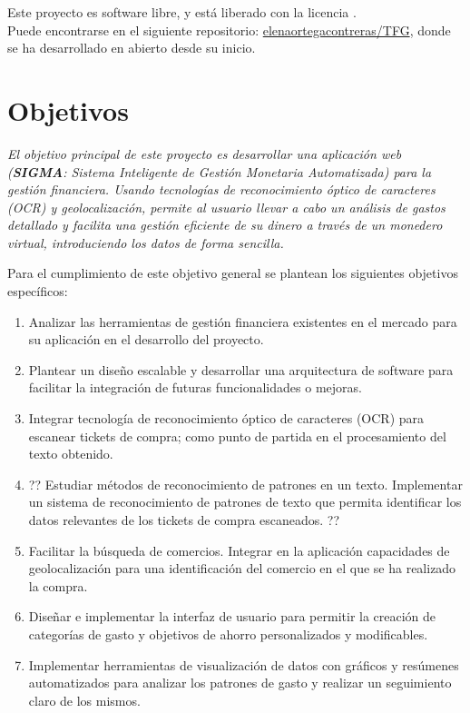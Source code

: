 Este proyecto es software libre, y está liberado con la licencia \cite{gplv3}.\\
Puede encontrarse en el siguiente repositorio:
\href{https://github.com/elenaortegacontreras/TFG}{elenaortegacontreras/TFG}, 
donde se ha desarrollado en abierto desde su inicio.

\section{Objetivos} \label{sect:goals}
\textit{El objetivo principal de este proyecto es desarrollar una aplicación web (\textbf{SIGMA}: Sistema Inteligente de Gestión Monetaria Automatizada) 
para la gestión financiera. Usando tecnologías de reconocimiento
óptico de caracteres (OCR) y geolocalización, permite al usuario llevar a cabo un 
análisis de gastos detallado y facilita una gestión eficiente de su dinero
a través de un monedero virtual, introduciendo los datos de 
forma sencilla.}

Para el cumplimiento de este objetivo general se plantean los siguientes objetivos específicos:
\begin{enumerate}
    \item Analizar las herramientas  
        de gestión financiera existentes en el mercado para su aplicación en el desarrollo del proyecto.  
    \item Plantear un diseño escalable y desarrollar una arquitectura de software
    para facilitar la integración de futuras funcionalidades o mejoras. 
    \item Integrar tecnología de reconocimiento óptico de caracteres (OCR) para escanear tickets de compra; como punto de partida en el procesamiento del texto obtenido.
    \item ?? Estudiar métodos de reconocimiento de patrones en un texto. Implementar 
        un sistema de reconocimiento de patrones de texto que permita identificar 
        los datos relevantes de los tickets de compra escaneados. ??
    \item Facilitar la búsqueda de comercios. Integrar en la aplicación capacidades de geolocalización para una identificación del comercio en el que se ha realizado la compra.
    \item Diseñar e implementar la interfaz de usuario para permitir la creación 
         de categorías de gasto y objetivos de ahorro personalizados y modificables.
    \item Implementar herramientas de visualización de datos con gráficos y resúmenes automatizados para analizar los patrones de gasto y realizar un seguimiento claro de los mismos.
    
\end{enumerate}